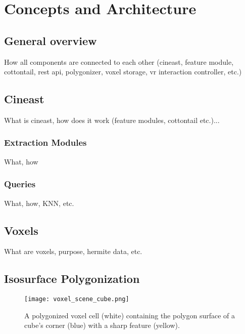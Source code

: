\chapter{Concepts and Architecture}

\section{General overview}
How all components are connected to each other (cineast, feature module, cottontail, rest api, polygonizer, voxel storage, vr interaction controller, etc.)

\section{Cineast}
What is cineast, how does it work (feature modules, cottontail etc.)...

\subsection{Extraction Modules}
What, how

\subsection{Queries}
What, how, KNN, etc.

\section{Voxels}
What are voxels, purpose, hermite data, etc.

\newpage
\section{Isosurface Polygonization}

\begin{wrapfigure}{R}{0.25\textwidth}
\texttt{[image: voxel\_scene\_cube.png]}
\caption{A polygonized voxel cell (white) containing the polygon surface of a cube's corner (blue) with a sharp feature (yellow).}
\label{fig:polygonized_cube_voxel_cell}
\end{wrapfigure}


